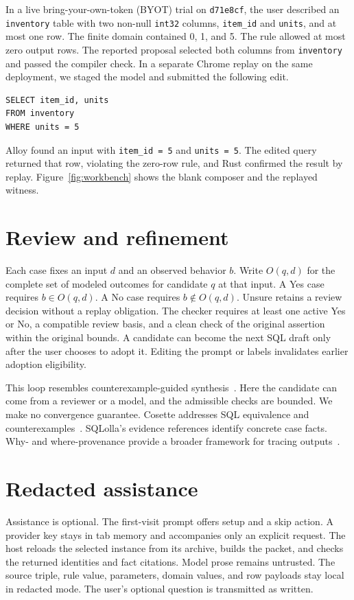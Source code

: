 \documentclass[sigconf,nonacm]{acmart}
\begin{document}
In a live bring-your-own-token (BYOT) trial on \texttt{d71e8cf}, the user described an \texttt{inventory} table with two non-null \texttt{int32} columns, \texttt{item\_id} and \texttt{units}, and at most one row. The finite domain contained 0, 1, and 5. The rule allowed at most zero output rows. The reported proposal selected both columns from \texttt{inventory} and passed the compiler check. In a separate Chrome replay on the same deployment, we staged the model and submitted the following edit.
\begin{verbatim}
SELECT item_id, units
FROM inventory
WHERE units = 5
\end{verbatim}
Alloy found an input with \texttt{item\_id = 5} and \texttt{units = 5}. The edited query returned that row, violating the zero-row rule, and Rust confirmed the result by replay. Figure~\ref{fig:workbench} shows the blank composer and the replayed witness.

\section{Review and refinement}
Each case fixes an input $d$ and an observed behavior $b$. Write $O(q,d)$ for the complete set of modeled outcomes for candidate $q$ at that input. A Yes case requires $b \in O(q,d)$. A No case requires $b \notin O(q,d)$. Unsure retains a review decision without a replay obligation. The checker requires at least one active Yes or No, a compatible review basis, and a clean check of the original assertion within the original bounds. A candidate can become the next SQL draft only after the user chooses to adopt it. Editing the prompt or labels invalidates earlier adoption eligibility.

This loop resembles counterexample-guided synthesis~\cite{solar2008}. Here the candidate can come from a reviewer or a model, and the admissible checks are bounded. We make no convergence guarantee. Cosette addresses SQL equivalence and counterexamples~\cite{chu2017}. SQLolla's evidence references identify concrete case facts. Why- and where-provenance provide a broader framework for tracing outputs~\cite{buneman2001}.

\section{Redacted assistance}
Assistance is optional. The first-visit prompt offers setup and a skip action. A provider key stays in tab memory and accompanies only an explicit request. The host reloads the selected instance from its archive, builds the packet, and checks the returned identities and fact citations. Model prose remains untrusted. The source triple, rule value, parameters, domain values, and row payloads stay local in redacted mode. The user's optional question is transmitted as written.
\end{document}
